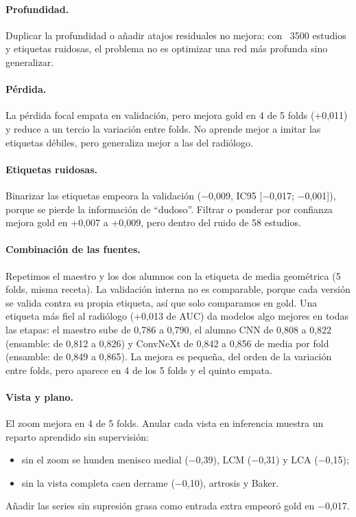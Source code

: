 \documentclass{article}
\begin{document}
\paragraph{Profundidad.} Duplicar la profundidad o añadir atajos residuales no mejora: con ~3500 estudios y etiquetas ruidosas, el problema no es optimizar una red más profunda sino generalizar.

\paragraph{Pérdida.} La pérdida focal empata en validación, pero mejora gold en 4 de 5 folds (+0,011) y reduce a un tercio la variación entre folds. No aprende mejor a imitar las etiquetas débiles, pero generaliza mejor a las del radiólogo.

\paragraph{Etiquetas ruidosas.} Binarizar las etiquetas empeora la validación ($-$0,009, IC95 [$-$0,017; $-$0,001]), porque se pierde la información de ``dudoso''. Filtrar o ponderar por confianza mejora gold en +0,007 a +0,009, pero dentro del ruido de 58 estudios.

\paragraph{Combinación de las fuentes.} Repetimos el maestro y los dos alumnos con la etiqueta de media geométrica (5 folds, misma receta). La validación interna no es comparable, porque cada versión se valida contra su propia etiqueta, así que solo comparamos en gold. Una etiqueta más fiel al radiólogo (+0,013 de AUC) da modelos algo mejores en todas las etapas: el maestro sube de 0,786 a 0,790, el alumno CNN de 0,808 a 0,822 (ensamble: de 0,812 a 0,826) y ConvNeXt de 0,842 a 0,856 de media por fold (ensamble: de 0,849 a 0,865). La mejora es pequeña, del orden de la variación entre folds, pero aparece en 4 de los 5 folds y el quinto empata.

\paragraph{Vista y plano.} El zoom mejora en 4 de 5 folds. Anular cada vista en inferencia muestra un reparto aprendido sin supervisión:
\begin{itemize}
  \item sin el zoom se hunden menisco medial ($-$0,39), LCM ($-$0,31) y LCA ($-$0,15);
  \item sin la vista completa caen derrame ($-$0,10), artrosis y Baker.
\end{itemize}
Añadir las series sin supresión grasa como entrada extra empeoró gold en $-$0,017.
\end{document}
